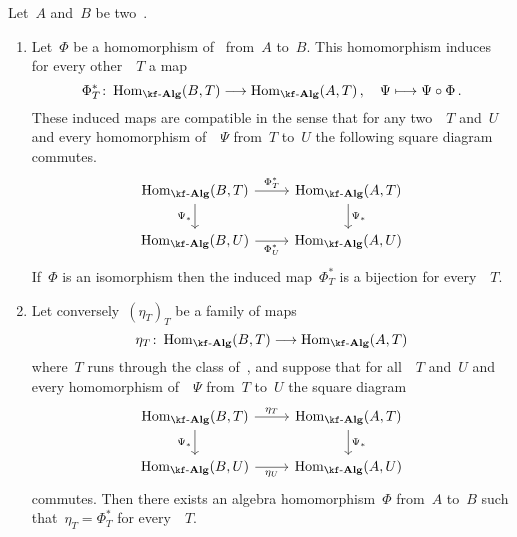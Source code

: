 \begin{proposition}
  \label{yoneda lemma very weak version}
  Let~$A$ and~$B$ be two~{\algebras{$\kf$}}.
  \begin{enumerate}
    \item
      Let~$\Phi$ be a homomorphism of~{\algebras{$\kf$}} from~$A$ to~$B$.
      This homomorphism induces for every other~{\algebra{$\kf$}}~$T$ a map
      \[
        \Phi^*_T
        \colon
        \Hom_{\cAlg{\kf}}(B,T) \to \Hom_{\cAlg{\kf}}(A,T) \,,
        \quad
        \Psi
        \mapsto
        \Psi \circ \Phi \,.
      \]
      These induced maps are compatible in the sense that for any two~{\algebras{$\kf$}}~$T$ and~$U$ and every homomorphism of~{\algebras{$\kf$}}~$\Psi$ from~$T$ to~$U$ the following square diagram commutes.
      \[
        \begin{tikzcd}
          \Hom_{\cAlg{\kf}}(B,T)
          \arrow{r}[above]{\Phi^*_T}
          \arrow{d}[left]{\Psi_*}
          &
          \Hom_{\cAlg{\kf}}(A,T)
          \arrow{d}[right]{\Psi_*}
          \\
          \Hom_{\cAlg{\kf}}(B,U)
          \arrow{r}[below]{\Phi^*_U}
          &
          \Hom_{\cAlg{\kf}}(A,U)
        \end{tikzcd}
      \]
      If~$\Phi$ is an isomorphism then the induced map~$\Phi^*_T$ is a bijection for every~{\algebra{$\kf$}}~$T$.
    \item
      \label{natural homomorphisms}
      Let conversely~$(\eta_T)_T$ be a family of maps
      \[
        \eta_T
        \colon
        \Hom_{\cAlg{\kf}}(B,T)
        \to
        \Hom_{\cAlg{\kf}}(A,T)
      \]
      where~$T$ runs through the class of~{\algebras{$\kf$}}, and suppose that for all~{\algebras{$\kf$}}~$T$ and~$U$ and every homomorphism of~{\algebras{$\kf$}}~$\Psi$ from~$T$ to~$U$ the square diagram
      \begin{equation}
        \label{natural square}
        \begin{tikzcd}
          \Hom_{\cAlg{\kf}}(B,T)
          \arrow{r}[above]{\eta_T}
          \arrow{d}[left]{\Psi_*}
          &
          \Hom_{\cAlg{\kf}}(A,T)
          \arrow{d}[right]{\Psi_*}
          \\
          \Hom_{\cAlg{\kf}}(B,U)
          \arrow{r}[below]{\eta_U}
          &
          \Hom_{\cAlg{\kf}}(A,U)
        \end{tikzcd}
      \end{equation}
      commutes.
      Then there exists an algebra homomorphism~$\Phi$ from~$A$ to~$B$ such that~$\eta_T = \Phi^*_T$ for every~{\algebra{$\kf$}}~$T$.

\end{enumerate}
\end{proposition}
